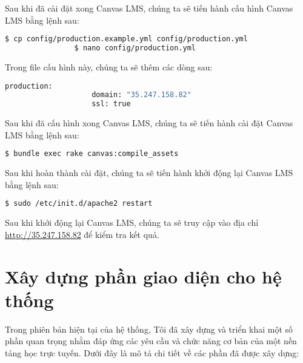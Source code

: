 \documentclass[../Thesis.tex]{subfiles}
\begin{document}
\begin{enumerate}
            Sau khi đã cài đặt xong Canvas LMS, chúng ta sẽ tiến hành cấu hình Canvas LMS bằng lệnh sau:
            \begin{lstlisting}[language=bash]
                $ cp config/production.example.yml config/production.yml
                $ nano config/production.yml
            \end{lstlisting}

            Trong file cấu hình này, chúng ta sẽ thêm các dòng sau:
            \begin{lstlisting}[language=bash]
                production:
                    domain: "35.247.158.82"
                    ssl: true
            \end{lstlisting}

            Sau khi đã cấu hình xong Canvas LMS, chúng ta sẽ tiến hành cài đặt Canvas LMS bằng lệnh sau:
            \begin{lstlisting}[language=bash]
                $ bundle exec rake canvas:compile_assets
            \end{lstlisting}

        Sau khi hoàn thành cài đặt, chúng ta sẽ tiến hành khởi động lại Canvas LMS bằng lệnh sau:
            \begin{lstlisting}[language=bash]
                $ sudo /etc/init.d/apache2 restart
            \end{lstlisting}

            Sau khi khởi động lại Canvas LMS, chúng ta sẽ truy cập vào địa chỉ \url{http://35.247.158.82} để kiểm tra kết quả.
        \end{enumerate}

\section{Xây dựng phần giao diện cho hệ thống}
\label{subsec:xay-dung-giao-dien}

    Trong phiên bản hiện tại của hệ thống, Tôi đã xây dựng và triển khai một số phần quan trọng nhằm đáp ứng các yêu cầu và chức năng cơ bản của một nền tảng học trực tuyến. Dưới đây là mô tả chi tiết về các phần đã được xây dựng:
\end{document}
